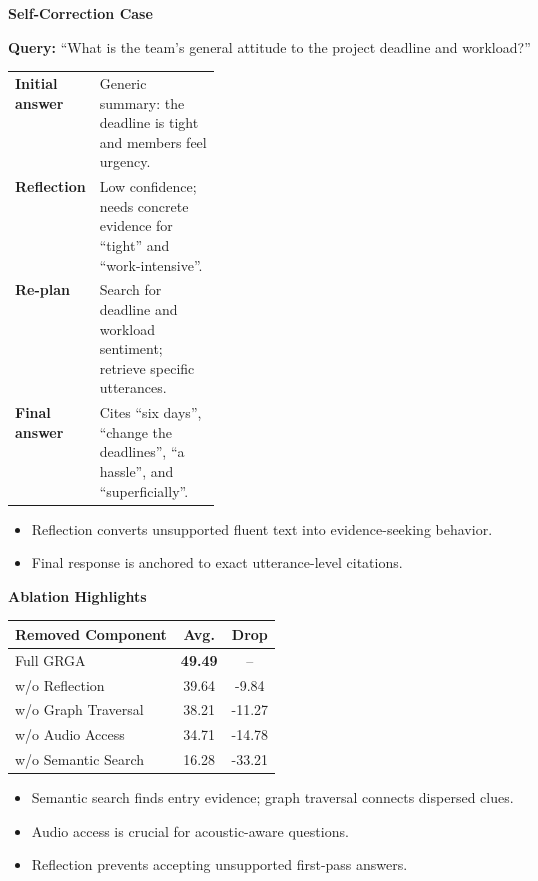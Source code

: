 \documentclass[final]{beamer}
\newlength{\contentWidth}
\newlength{\columnGap}
\newlength{\mainColumn}
\newcommand{\sectionTitle}[1]{%
  \vspace{0.2em}
  {\fontsize{32}{38}\selectfont\bfseries\color{AppleBlack}#1\par}
  \vspace{0.18em}
}
\newcommand{\bodyText}{\fontsize{19.5}{24}\selectfont}
\newcommand{\smallText}{\fontsize{16.5}{20}\selectfont}
\newenvironment{posterlist}{
  \begin{itemize}
    \setlength{\itemsep}{0.32em}
    \setlength{\parsep}{0pt}
    \setlength{\leftmargin}{1.1em}
    \bodyText
}{
  \end{itemize}
}
\newenvironment{postercontent}{%
  \par\noindent\hspace*{\dimexpr(\linewidth-\contentWidth)/2\relax}%
  \begin{minipage}{\contentWidth}%
}{%
  \end{minipage}\par
}
\begin{document}
\begin{frame}[t]
\begin{postercontent}
\begin{columns}[t,totalwidth=\linewidth]
\begin{column}{\mainColumn}
  \begin{posterbox}
    \sectionTitle{Self-Correction Case}
    \begin{whitebox}
      \smallText
      \textbf{Query:} ``What is the team's general attitude to the project deadline and workload?''\par
      \vspace{0.35cm}
      \begin{tabularx}{\linewidth}{>{\bfseries}p{0.24\linewidth}Y}
        \toprule
        Initial answer & Generic summary: the deadline is tight and members feel urgency. \\
        Reflection & Low confidence; needs concrete evidence for ``tight'' and ``work-intensive''. \\
        Re-plan & Search for deadline and workload sentiment; retrieve specific utterances. \\
        Final answer & Cites ``six days'', ``change the deadlines'', ``a hassle'', and ``superficially''. \\
        \bottomrule
      \end{tabularx}
    \end{whitebox}
    \begin{posterlist}
      \item Reflection converts unsupported fluent text into evidence-seeking behavior.
      \item Final response is anchored to exact utterance-level citations.
    \end{posterlist}
  \end{posterbox}

  \begin{posterbox}
    \sectionTitle{Ablation Highlights}
    \smallText
    \begin{tabularx}{\linewidth}{Ycc}
      \toprule
      \textbf{Removed Component} & \textbf{Avg.} & \textbf{Drop} \\
      \midrule
      Full GRGA & \textbf{49.49} & -- \\
      w/o Reflection & 39.64 & -9.84 \\
      w/o Graph Traversal & 38.21 & -11.27 \\
      w/o Audio Access & 34.71 & -14.78 \\
      w/o Semantic Search & 16.28 & -33.21 \\
      \bottomrule
    \end{tabularx}
    \vspace{0.35cm}
    \begin{posterlist}
      \item Semantic search finds entry evidence; graph traversal connects dispersed clues.
      \item Audio access is crucial for acoustic-aware questions.
      \item Reflection prevents accepting unsupported first-pass answers.
    \end{posterlist}
  \end{posterbox}
\end{column}
\hspace{\columnGap}


\end{columns}
\end{postercontent}
\end{frame}
\end{document}
